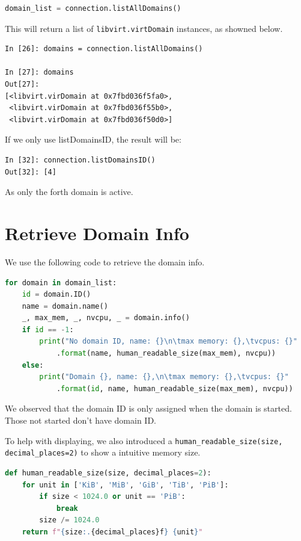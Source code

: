 \documentclass[12pt]{article}
\begin{document}
\begin{lstlisting}[language=python]
domain_list = connection.listAllDomains()
\end{lstlisting}

This will return a list of \texttt{libvirt.virtDomain} instances, as showned below.

\begin{lstlisting}
In [26]: domains = connection.listAllDomains()

In [27]: domains
Out[27]: 
[<libvirt.virDomain at 0x7fbd036f5fa0>,
 <libvirt.virDomain at 0x7fbd036f55b0>,
 <libvirt.virDomain at 0x7fbd036f50d0>]
\end{lstlisting}

If we only use listDomainsID, the result will be:

\begin{lstlisting}
In [32]: connection.listDomainsID()
Out[32]: [4]
\end{lstlisting}

As only the forth domain is active.

\section{Retrieve Domain Info}

We use the following code to retrieve the domain info.

\begin{lstlisting}[language=python]
for domain in domain_list:
    id = domain.ID()
    name = domain.name()
    _, max_mem, _, nvcpu, _ = domain.info()
    if id == -1:
        print("No domain ID, name: {}\n\tmax memory: {},\tvcpus: {}"
            .format(name, human_readable_size(max_mem), nvcpu))
    else:
        print("Domain {}, name: {},\n\tmax memory: {},\tvcpus: {}"
            .format(id, name, human_readable_size(max_mem), nvcpu))
\end{lstlisting}

We observed that the domain ID is only assigned when the domain is started. Those not started don't have domain ID.

To help with displaying, we also introduced a \texttt{human\_readable\_size(size, decimal\_places=2)} to show a intuitive memory size.

\begin{lstlisting}[language=python]
def human_readable_size(size, decimal_places=2):
    for unit in ['KiB', 'MiB', 'GiB', 'TiB', 'PiB']:
        if size < 1024.0 or unit == 'PiB':
            break
        size /= 1024.0
    return f"{size:.{decimal_places}f} {unit}"
\end{lstlisting}
\end{document}
